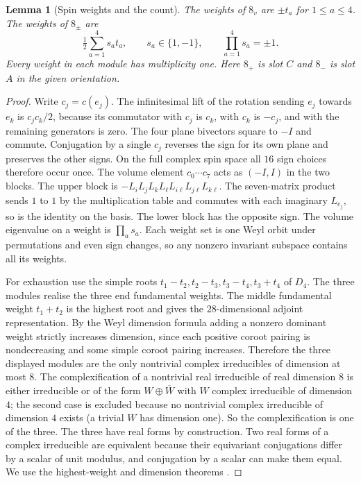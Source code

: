 \documentclass[aps,pra,onecolumn,superscriptaddress,nofootinbib,10pt]{revtex4-2}
\newtheorem{lemma}[theorem]{Lemma}
\theoremstyle{definition}
\theoremstyle{remark}
\begin{document}
\begin{lemma}[Spin weights and the count]\label{tr:spinweights}
The weights of \(8_v\) are \(\pm t_a\) for \(1\leq a\leq4\).
The weights of \(8_\pm\) are
\[
 \tfrac12\sum_{a=1}^{4}s_a t_a,\qquad s_a\in\{1,-1\},\qquad
 \prod_{a=1}^{4}s_a=\pm1.
\]
Every weight in each module has multiplicity one. Here \(8_+\)
is slot \(C\) and \(8_-\) is slot \(A\) in the given orientation.
\end{lemma}
\begin{proof}
Write \(c_j=c(e_j)\). The infinitesimal lift of the rotation
sending \(e_j\) towards \(e_k\) is \(c_jc_k/2\), because its commutator
with \(c_j\) is \(c_k\), with \(c_k\) is \(-c_j\), and with the
remaining generators is zero. The four plane bivectors square to
\(-I\) and commute. Conjugation by a single \(c_j\) reverses the sign
for its own plane and preserves the other signs. On the full complex
spin space all \(16\) sign choices therefore occur once.
The volume element \(c_0\cdots c_7\) acts as \((-I,I)\) in the
two blocks. The upper block is \(-L_iL_jL_kL_\ell L_{i\ell}L_{j\ell}L_{k\ell}\).
The seven-matrix product sends \(1\) to \(1\) by the multiplication
table and commutes with each imaginary \(L_{e_j}\), so is the identity
on the basis. The lower block has the opposite sign.
The volume eigenvalue on a weight is \(\prod_a s_a\).
Each weight set is one Weyl orbit under permutations and even sign
changes, so any nonzero invariant subspace contains all its weights.

For exhaustion use the simple roots \(t_1-t_2,t_2-t_3,t_3-t_4,t_3+t_4\)
of \(D_4\). The three modules realise the three end fundamental
weights. The middle fundamental weight \(t_1+t_2\) is the highest
root and gives the \(28\)-dimensional adjoint representation.
By the Weyl dimension formula adding a nonzero dominant weight
strictly increases dimension, since each positive coroot pairing
is nondecreasing and some simple coroot pairing increases.
Therefore the three displayed modules are the only nontrivial
complex irreducibles of dimension at most \(8\). The complexification of a nontrivial
real irreducible of real dimension \(8\) is either irreducible or of the form \(W\oplus\overline W\) with \(W\) complex
irreducible of dimension \(4\); the second case is excluded because no nontrivial complex irreducible of
dimension \(4\) exists (a trivial \(W\) has dimension one).  So the complexification is one of the three. The three have real forms by construction.
Two real forms of a complex irreducible are equivalent because
their equivariant conjugations differ by a scalar of unit modulus,
and conjugation by a scalar can make them equal. We use the
highest-weight and dimension theorems \cite[\S\S21, 24]{tr:Humphreys}.
\end{proof}
\end{document}
